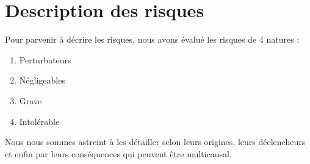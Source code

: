 \documentclass[12pt]{article}
\begin{document}
\section{Description des risques}
Pour parvenir à décrire les risques, nous avons évalué les risques de 4 natures :
\begin{enumerate}
	\item Perturbateurs
	\item Négligeables
	\item Grave
	\item Intolérable
\end{enumerate}

Nous nous sommes astreint à les détailler selon leurs origines, leurs déclencheurs et enfin par leurs conséquences qui peuvent être multicausal.
\end{document}

